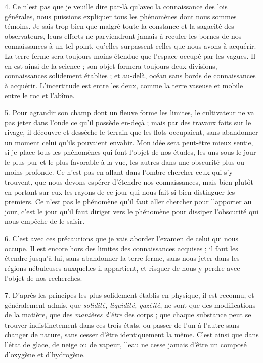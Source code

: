 \documentclass[a4paper, 11pt, oneside, polutonikogreek, french]{article}
\begin{document}
4. Ce n'est pas que je veuille dire par-là qu'avec la connaissance des lois générales, nous puissions expliquer tous les phénomènes dont nous sommes témoins. Je sais trop bien que malgré toute la constance et la sagacité des observateurs, leurs efforts ne parviendront jamais à reculer les bornes de nos connaissances à un tel point, qu'elles surpassent celles que nous avons à acquérir. La terre ferme sera toujours moins étendue que l'espace occupé par les vagues. Il en est ainsi de la science ; son objet formera toujours deux divisions, connaissances solidement établies ; et au-delà, océan sans bords de connaissances à acquérir. L'incertitude est entre les deux, comme la terre vaseuse et mobile entre le roc et l'abîme.

5. Pour agrandir son champ dont un fleuve forme les limites, le cultivateur ne va pas jeter dans l'onde ce qu'il possède en-deçà ; mais par des travaux faits sur le rivage, il découvre et dessèche le terrain que les flots occupaient, sans abandonner un moment celui qu'ils pouvaient envahir. Mon idée sera peut-être mieux sentie, si je place tous les phénomènes qui font l'objet de nos études, les uns sous le jour le plus pur et le plus favorable à la vue, les autres dans une obscurité plus ou moins profonde. Ce n'est pas en allant dans l'ombre chercher ceux qui s'y trouvent, que nous devons espérer d'étendre nos connaissances, mais bien plutôt en portant sur eux les rayons de ce jour qui nous fait si bien distinguer les premiers. Ce n'est pas le phénomène qu'il faut aller chercher pour l'apporter au jour, c'est le jour qu'il faut diriger vers le phénomène pour dissiper l'obscurité qui nous empêche de le saisir.

6. C'est avec ces précautions que je vais aborder l'examen de celui qui nous occupe. Il est encore hors des limites des connaissances acquises ; il faut les étendre jusqu'à lui, sans abandonner la terre ferme, sans nous jeter dans les régions nébuleuses auxquelles il appartient, et risquer de nous y perdre avec l'objet de nos recherches.

7. D'après les principes les plus solidement établis en physique, il est reconnu, et généralement admis, que \emph{solidité, liquidité, gazéité}, ne sont que des modifications de la matière, que des \emph{manières d'être} des corps ; que chaque substance peut se trouver indistinctement dans ces trois états, ou passer de l'un à l'autre sans changer de nature, sans cesser d'être identiquement la même. C'est ainsi que dans l'état de glace, de neige ou de vapeur, l'eau ne cesse jamais d'être un composé d'oxygène et d'hydrogène.
\end{document}
